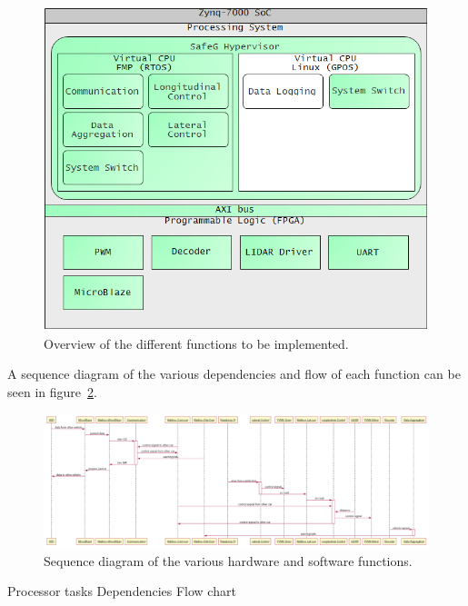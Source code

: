 \begin{figure}[H]
\centering
\includegraphics[width=\textwidth]{./img/design_overview.png}
\caption{Overview of the different functions to be implemented.}\label{fig:overview}
\end{figure}

A sequence diagram of the various dependencies and flow of each function can be seen in figure~\ref{fig:sequence}.

\begin{figure}[H]
\centering
\includegraphics[width=\textwidth]{./img/design_sequence.png}
\caption{Sequence diagram of the various hardware and software functions.}\label{fig:sequence}
\end{figure}

Processor tasks
Dependencies
Flow chart